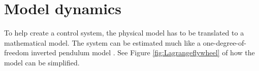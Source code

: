 \documentclass[a4paper,11pt]{kth-mag}
\begin{document}


\section{Model dynamics} \label{section: model dynamics}
To help create a control system, the physical model has to be translated to a mathematical model. The system can be estimated much like a one-degree-of-freedom inverted pendulum model \cite{KTHpendulum}. See Figure \ref{fig:Lagrangeflywheel} of how the model can be simplified.
\end{document}
